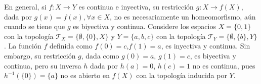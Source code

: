 

\begin{remark}
En general, si $f : X \longrightarrow Y$ es continua e inyectiva, su restricción $g : X \longrightarrow f(X)$, dada por $g(x) = f(x), \forall x \in X$, no es necesariamente un homeomorfismo, aún cuando se tiene que $g$ es biyectiva y continua. Considere los espacios $X = \{ 0,1 \}$ con la topología $\mathcal{T}_X = \{ \emptyset, \{ 0 \}, X \}$ y $Y = \{ a, b, c \}$ con la topología $\mathcal{T}_Y = \{ \emptyset, \{ b \}, Y \}$. La función $f$ definida como $f(0) = c$,$f(1) = a$, es inyectiva y continua. Sin embargo, su restricción $g$, dada como $g(0) = a$, $g(1) = c$, es biyectiva y continua, pero su inversa $h$ dada por $h(a) = 0$, $h(c) = 1$ no es continua, pues $h^{-1}(\{ 0 \}) = \{ a \}$ no es abierto en $f(X)$ con la topología inducida por $Y$.
\end{remark}
